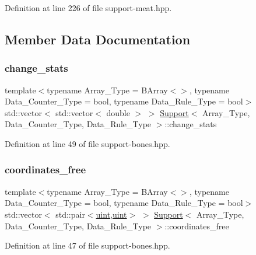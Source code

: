 Definition at line 226 of file support-\/meat.\+hpp.



\subsection{Member Data Documentation}
\mbox{\label{class_support_a500e5cc6eae028e6323c94641a070843}} 
\subsubsection{\texorpdfstring{change\+\_\+stats}{change\_stats}}
{\footnotesize\ttfamily template$<$typename Array\+\_\+\+Type = B\+Array$<$$>$, typename Data\+\_\+\+Counter\+\_\+\+Type = bool, typename Data\+\_\+\+Rule\+\_\+\+Type = bool$>$ \\
std\+::vector$<$ std\+::vector$<$ double $>$ $>$ \hyperlink{class_support}{Support}$<$ Array\+\_\+\+Type, Data\+\_\+\+Counter\+\_\+\+Type, Data\+\_\+\+Rule\+\_\+\+Type $>$\+::change\+\_\+stats}



Definition at line 49 of file support-\/bones.\+hpp.

\mbox{\label{class_support_a36f6685c1f22eeca1919dfbb0ff4cb54}} 
\subsubsection{\texorpdfstring{coordinates\+\_\+free}{coordinates\_free}}
{\footnotesize\ttfamily template$<$typename Array\+\_\+\+Type = B\+Array$<$$>$, typename Data\+\_\+\+Counter\+\_\+\+Type = bool, typename Data\+\_\+\+Rule\+\_\+\+Type = bool$>$ \\
std\+::vector$<$ std\+::pair$<$\hyperlink{typedefs_8hpp_a91ad9478d81a7aaf2593e8d9c3d06a14}{uint},\hyperlink{typedefs_8hpp_a91ad9478d81a7aaf2593e8d9c3d06a14}{uint}$>$ $>$ \hyperlink{class_support}{Support}$<$ Array\+\_\+\+Type, Data\+\_\+\+Counter\+\_\+\+Type, Data\+\_\+\+Rule\+\_\+\+Type $>$\+::coordinates\+\_\+free}



Definition at line 47 of file support-\/bones.\+hpp.

